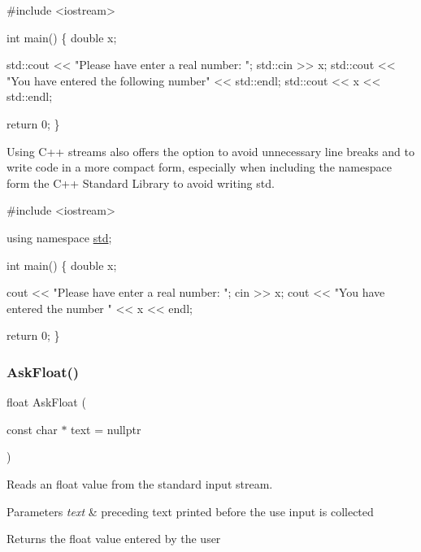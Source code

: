 \begin{DoxyCode}
\textcolor{preprocessor}{#include <iostream>}

\textcolor{keywordtype}{int} main()
\{
  \textcolor{keywordtype}{double} x;

  std::cout << \textcolor{stringliteral}{"Please have enter a real number: "};
  std::cin >> x;
  std::cout << \textcolor{stringliteral}{"You have entered the following number"} << std::endl;
  std::cout << x << std::endl;

  \textcolor{keywordflow}{return} 0;
\}
\end{DoxyCode}


Using C++ streams also offers the option to avoid unnecessary line breaks and to write code in a more compact form, especially when including the namespace form the C++ Standard Library to avoid writing {\ttfamily std}.


\begin{DoxyCode}
\textcolor{preprocessor}{#include <iostream>}

\textcolor{keyword}{using namespace }\hyperlink{namespacestd}{std};

\textcolor{keywordtype}{int} main()
\{
  \textcolor{keywordtype}{double} x;

  cout << \textcolor{stringliteral}{"Please have enter a real number: "};
  cin >> x;
  cout << \textcolor{stringliteral}{"You have entered the number "} << x << endl;

  \textcolor{keywordflow}{return} 0;
\}
\end{DoxyCode}
 \mbox{\label{group__io__group_ga973515b754711fc89a018ce64f980c74}} 
\subsubsection{\texorpdfstring{Ask\+Float()}{AskFloat()}}
{\footnotesize\ttfamily float Ask\+Float (\begin{DoxyParamCaption}\item[{const char $\ast$}]{text = {\ttfamily nullptr} }\end{DoxyParamCaption})}

Reads an float value from the standard input stream.


\begin{DoxyParams}{Parameters}
{\em text} & preceding text printed before the use input is collected \\
\hline
\end{DoxyParams}
\begin{DoxyReturn}{Returns}
the float value entered by the user 
\end{DoxyReturn}
\mbox{\label{group__io__group_gae3d41902eb45488b04016096918d605c}} 

